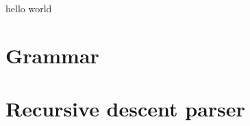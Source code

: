 

\renewcommand\TITLE{Compiler}


\topmatter

hello world

\chapter{Grammar}


\chapter{Recursive descent parser}



